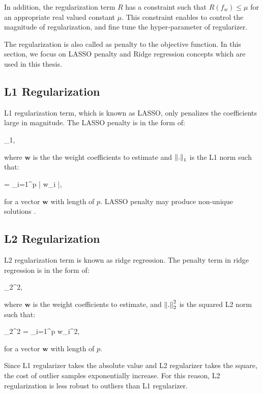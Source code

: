 In addition, the regularization term $R$ has a constraint such that $R(f_{w}) \leq \textbf{$\mu$}$ for an appropriate real valued constant $\textbf{$\mu$}$. This constraint enables to control the magnitude of regularization, and fine tune the hyper-parameter of regularizer.

The regularization is also called as penalty to the objective function. In this section, we focus on LASSO penalty and Ridge regression concepts which are used in this thesis.

\subsection{L1 Regularization}

L1 regularization term, which is known as LASSO, only penalizes the coefficients large in magnitude. The LASSO penalty is in the form of:

\be
\label{eq:lasso_term}
\lambda {}_{1},
\ee

where $\textbf{w}$ is the the weight coefficients to estimate and $\left\lVert.\right\rVert_{1}$ is the L1 norm such that:

\be
\label{eq:l1_norm}
 = \sum_{i=1}^{p} | w_{i} |,
\ee

for a vector $\textbf{w}$ with length of $p$. LASSO penalty may produce non-unique solutions \cite{lasso_penalty}.

\subsection{L2 Regularization}

L2 regularization term is known as ridge regression. The penalty term in ridge regression is in the form of:

\be
\label{eq:ridge_term}
\lambda {}_{2}^{2},
\ee

where $\textbf{w}$ is the weight coefficients to estimate, and $\left\lVert.\right\rVert_{2}^{2}$ is the squared L2 norm such that:

\be
\label{eq:l2_norm}
_{2}^{2} = \sum_{i=1}^{p} w_{i}^2,
\ee

for a vector $\textbf{w}$ with length of $p$. 

Since L1 regularizer takes the absolute value and L2 regularizer takes the square, the cost of outlier samples exponentially increase. For this reason, L2 regularization is less robust to outliers than L1 regularizer.

\newpage

